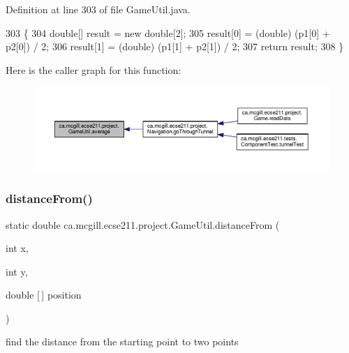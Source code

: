 Definition at line 303 of file Game\+Util.\+java.


\begin{DoxyCode}
303                                                      \{
304     \textcolor{keywordtype}{double}[] result = \textcolor{keyword}{new} \textcolor{keywordtype}{double}[2];
305     result[0] = (double) (p1[0] + p2[0]) / 2;
306     result[1] = (double) (p1[1] + p2[1]) / 2;
307     \textcolor{keywordflow}{return} result;
308   \}
\end{DoxyCode}
Here is the caller graph for this function\+:\nopagebreak
\begin{figure}[H]
\begin{center}
\leavevmode
\includegraphics[width=350pt]{classca_1_1mcgill_1_1ecse211_1_1project_1_1_game_util_ae5c5c445ab84516991219ca3783fcaa4_icgraph}
\end{center}
\end{figure}
\mbox{\label{classca_1_1mcgill_1_1ecse211_1_1project_1_1_game_util_a6fb324a3d5e42414c83dfd8bd5910b56}} 
\subsubsection{\texorpdfstring{distance\+From()}{distanceFrom()}}
{\footnotesize\ttfamily static double ca.\+mcgill.\+ecse211.\+project.\+Game\+Util.\+distance\+From (\begin{DoxyParamCaption}\item[{int}]{x,  }\item[{int}]{y,  }\item[{double \mbox{[}$\,$\mbox{]}}]{position }\end{DoxyParamCaption})\hspace{0.3cm}{\ttfamily [static]}}

find the distance from the starting point to two points


